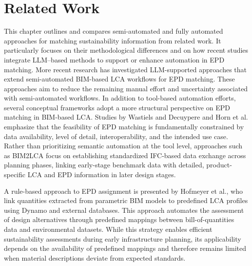 \documentclass[10pt, a4paper, twocolumn]{article}
\begin{document}
\section{Related Work}

This chapter outlines and compares semi-automated and fully automated approaches for matching sustainability information from related work. It particularly focuses on their methodological differences and on how recent studies integrate LLM–based methods to support or enhance automation in EPD matching. 
More recent research has investigated LLM-supported approaches that extend semi-automated BIM-based LCA workflows for EPD matching. These approaches aim to reduce the remaining manual effort and uncertainty associated with semi-automated workflows.  
In addition to tool-based automation efforts, several conceptual frameworks adopt a more structural perspective on EPD matching in BIM-based LCA. Studies by Wastiels and Decuypere and Horn et al. emphasize that the feasibility of EPD matching is fundamentally constrained by data availability, level of detail, interoperability, and the intended use case. Rather than prioritizing semantic automation at the tool level, approaches such as BIM2LCA focus on establishing standardized IFC-based data exchange across planning phases, linking early-stage benchmark data with detailed, product-specific LCA and EPD information in later design stages. ~\cite{Wastiels.2019, Horn.2020} 

A rule-based approach to EPD assignment is presented by Hofmeyer et al., who link quantities extracted from parametric BIM models to predefined LCA profiles using Dynamo and external databases. This approach automates the assessment of design alternatives through predefined mappings between bill-of-quantities data and environmental datasets. While this strategy enables efficient sustainability assessments during early infrastructure planning, its applicability depends on the availability of predefined mappings and therefore remains limited when material descriptions deviate from expected standards. ~\cite{J.HofmeyerK.ForthS.EsserA.Borrmann.}
\end{document}
